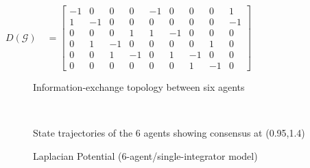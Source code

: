 \documentclass[journal]{IEEEtran}
\begin{document}
$ D(\mathcal{G})\quad = \begin{bmatrix}
-1&0&0&0&-1&0&0&0&1\\1&-1&0&0&0&0&0&0&-1\\0&0&0&1&1&-1&0&0&0\\0&1&-1&0&0&0&0&1&0\\0&0&1&-1&0&1&-1&0&0\\0&0&0&0&0&0&1&-1&0
\end{bmatrix}$ \\
\begin{figure}[h]
\caption{Information-exchange topology between six agents}
\end{figure}\\
\begin{figure}[h]
\caption{State trajectories of the 6 agents showing consensus at (0.95,1.4)}
\end{figure}
\begin{figure}[h]
\caption{Laplacian Potential (6-agent/single-integrator model)}
\end{figure}
\end{document}
